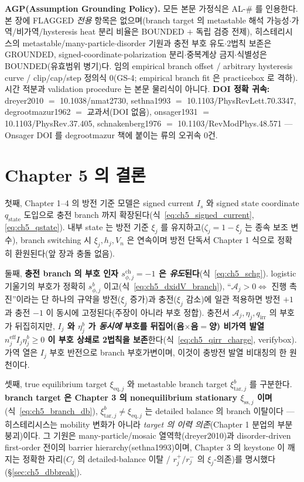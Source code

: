 \documentclass[11pt,a4paper]{article}
\newcommand{\eff}{\mathrm{eff}}
\newcommand{\eq}{\mathrm{eq}}
\newcommand{\irr}{\mathrm{irr}}
\newcommand{\chg}{\mathrm{ch}}
\newcommand{\tar}{\mathrm{tar}}
\newcommand{\stt}{\mathrm{state}}
\newcommand{\sstat}{\mathrm{ss}}
\begin{document}
\textbf{AGP(Assumption Grounding Policy).} 모든 본문 가정식은 AL-\# 를 인용한다. 본 장에 FLAGGED \emph{전용}
항목은 없으며(branch target 의 metastable 해석 가능성$\cdot$가역/비가역/hysteresis heat 분리 비율은 BOUNDED $+$
독립 검증 전제), 히스테리시스의 metastable/many-particle$\cdot$disorder 기원과 충전 부호 유도$\cdot$2법칙 보존은
GROUNDED, signed-coordinate$\cdot$polarization 분리$\cdot$중복계상 금지$\cdot$식별성은 BOUNDED(유효범위 병기)다.
임의 empirical branch offset / arbitrary hysteresis curve / clip/cap/step 정의식 0(GS-4; empirical branch fit
은 practicebox 로 격하). 시간 적분과 validation procedure 는 본문 물리식이 아니다. \textbf{DOI 정확 귀속:}
dreyer2010 $=$ 10.1038/nmat2730, sethna1993 $=$ 10.1103/PhysRevLett.70.3347, degrootmazur1962 $=$
교과서(DOI 없음), onsager1931 $=$ 10.1103/PhysRev.37.405, schnakenberg1976 $=$ 10.1103/RevModPhys.48.571 —
Onsager DOI 를 degrootmazur 책에 붙이는 류의 오귀속 0건.

\section{Chapter 5 의 결론}\label{sec:ch5_concl}
첫째, Chapter 1--4 의 방전 기준 모델은 signed current $I_s$ 와 signed state coordinate $q_\stt$ 도입으로 충전
branch 까지 확장된다(식~\eqref{eq:ch5_signed_current},\allowbreak\eqref{eq:ch5_qstate}). 내부 state 는 방전
기준 $\xi_j$ 를 유지하고($\zeta_j=1-\xi_j$ 는 종속 보조 변수), branch switching 시 $\xi_j,h_j,V_n$ 은 연속이며
방전 단독서 Chapter 1 식으로 정확히 환원된다(앞 장과 충돌 없음).

둘째, \textbf{충전 branch 의 부호 인자 $s_{\phi,j}^\chg=-1$ 은 \emph{유도}된다}(식~\eqref{eq:ch5_schg}). logistic
기울기의 부호가 정확히 $s_{\phi,j}^b$ 이고(식~\eqref{eq:ch5_dxidV_branch}), ``$\mathcal A_j>0\Leftrightarrow$
진행 촉진''이라는 단 하나의 규약을 방전($\xi_j$ 증가)과 충전($\xi_j$ 감소)에 일관 적용하면 방전 $+1$ 과 충전
$-1$ 이 동시에 고정된다(주장이 아니라 부호 정합). 충전서 $\mathcal A_j,\eta_j,
q_\irr$ 의 부호가 뒤집히지만, \textbf{$I_j$ 와 $\eta_j^b$ 가 \emph{동시에} 부호를 뒤집어(음$\times$음$=$양)
비가역 발열 $n_j^{\eff}I_j\eta_j^b\ge0$ 이 부호 상쇄로 2법칙을 보존}한다(식~\eqref{eq:ch5_qirr_charge}, verifybox).
가역 열은 $I_j$ 부호 반전으로 branch 부호가변이며, 이것이 충방전 발열 비대칭의 한 원천이다.

셋째, true equilibrium target $\xi_{\eq,j}$ 와 metastable branch target $\xi_{\tar,j}^b$ 를 구분한다.
\textbf{branch target 은 Chapter 3 의 nonequilibrium stationary $\xi_{\sstat,j}$ 이며}(식~\eqref{eq:ch5_branch_db}),
$\xi_{\tar,j}^b\ne\xi_{\eq,j}$ 는 detailed balance 의 branch 이탈이다 — 히스테리시스는 mobility 변화가 아니라
\emph{target 의 이력 의존}(Chapter 1 분업의 부분 붕괴)이다. 그 기원은 many-particle/mosaic 열역학(dreyer2010)과
disorder-driven first-order 전이의 barrier hierarchy(sethna1993)이며, Chapter 3 의 keystone 이 깨지는 정확한
자리($C_j$ 의 detailed-balance 이탈 / $r_j^+/r_j^-$ 의 $\xi_j$-의존)를 명시했다(\S\ref{sec:ch5_dbbreak}).
\end{document}
